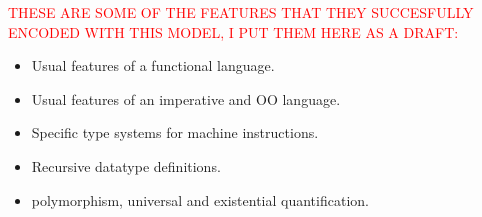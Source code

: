 \documentclass{article}
\begin{document}
\textcolor{red}{
  THESE ARE SOME OF THE FEATURES THAT THEY SUCCESFULLY 
  ENCODED WITH THIS MODEL, I PUT THEM HERE AS A DRAFT:
}

\begin{itemize}
  \item Usual features of a functional language.
  \item Usual features of an imperative and OO language.
  \item Specific type systems for machine instructions.
  \item Recursive datatype definitions.
  \item polymorphism, universal and existential quantification.
\end{itemize}


{}

\end{document}

